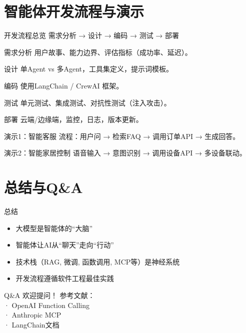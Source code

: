 \section{智能体开发流程与演示}

\begin{frame}{开发流程总览}
需求分析 → 设计 → 编码 → 测试 → 部署
\end{frame}
\begin{frame}{需求分析}
用户故事、能力边界、评估指标（成功率、延迟）。
\end{frame}
\begin{frame}{设计}
单Agent vs 多Agent，工具集定义，提示词模板。
\end{frame}
\begin{frame}{编码}
使用LangChain / CrewAI 框架。
\end{frame}
\begin{frame}{测试}
单元测试、集成测试、对抗性测试（注入攻击）。
\end{frame}
\begin{frame}{部署}
云端/边缘端，监控，日志，版本更新。
\end{frame}
\begin{frame}{演示1：智能客服}
流程：用户问 → 检索FAQ → 调用订单API → 生成回答。
\end{frame}
\begin{frame}{演示2：智能家居控制}
语音输入 → 意图识别 → 调用设备API → 多设备联动。
\end{frame}

\section{总结与Q&A}

\begin{frame}{总结}
\begin{itemize}
\item 大模型是智能体的“大脑”
\item 智能体让AI从“聊天”走向“行动”
\item 技术栈（RAG, 微调, 函数调用, MCP等）是神经系统
\item 开发流程遵循软件工程最佳实践
\end{itemize}
\end{frame}

\begin{frame}{Q\&A}
欢迎提问！
\vspace{1cm}
参考文献：\\

· OpenAI Function Calling\\
· Anthropic MCP\\
· LangChain文档
  \end{frame}

